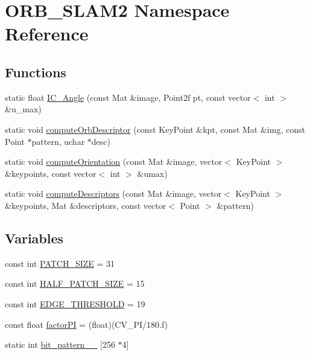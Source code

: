 \hypertarget{namespaceORB__SLAM2}{}\section{O\+R\+B\+\_\+\+S\+L\+A\+M2 Namespace Reference}
\label{namespaceORB__SLAM2}
\subsection*{Functions}
\begin{DoxyCompactItemize}
\item 
static float \hyperlink{namespaceORB__SLAM2_ac570dbdaae2d483745515b5022fd6820}{I\+C\+\_\+\+Angle} (const Mat \&image, Point2f pt, const vector$<$ int $>$ \&u\+\_\+max)
\item 
static void \hyperlink{namespaceORB__SLAM2_a932693f631bfe871700d02c72e14c6cd}{compute\+Orb\+Descriptor} (const Key\+Point \&kpt, const Mat \&img, const Point $\ast$pattern, uchar $\ast$desc)
\item 
static void \hyperlink{namespaceORB__SLAM2_a40adb6b621d7c2dd9d2961ba88e445c8}{compute\+Orientation} (const Mat \&image, vector$<$ Key\+Point $>$ \&keypoints, const vector$<$ int $>$ \&umax)
\item 
static void \hyperlink{namespaceORB__SLAM2_ad90997cdb916a99c644c0959e08cf4df}{compute\+Descriptors} (const Mat \&image, vector$<$ Key\+Point $>$ \&keypoints, Mat \&descriptors, const vector$<$ Point $>$ \&pattern)
\end{DoxyCompactItemize}
\subsection*{Variables}
\begin{DoxyCompactItemize}
\item 
const int \hyperlink{namespaceORB__SLAM2_a557e5c298c5f7164667f083494c2197a}{P\+A\+T\+C\+H\+\_\+\+S\+I\+ZE} = 31
\item 
const int \hyperlink{namespaceORB__SLAM2_aa09849ae679bf2392b097abd710d8d7f}{H\+A\+L\+F\+\_\+\+P\+A\+T\+C\+H\+\_\+\+S\+I\+ZE} = 15
\item 
const int \hyperlink{namespaceORB__SLAM2_aec00f1ad4dea35755e3af4404282cd3b}{E\+D\+G\+E\+\_\+\+T\+H\+R\+E\+S\+H\+O\+LD} = 19
\item 
const float \hyperlink{namespaceORB__SLAM2_a8015b470ffeb885a0c90837a03b3210f}{factor\+PI} = (float)(C\+V\+\_\+\+PI/180.f)
\item 
static int \hyperlink{namespaceORB__SLAM2_a8dd21ee063eca2b0bc3f5e76ceba0492}{bit\+\_\+pattern\+\_\+\_\+} \mbox{[}256 $\ast$4\mbox{]}
\end{DoxyCompactItemize}


